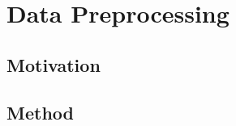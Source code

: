 \chapter{Data Preprocessing} \label{sec:datapreprocessing}








\section{Motivation}

\section{Method}
